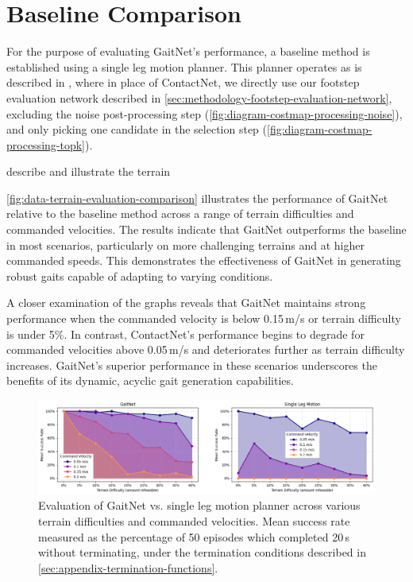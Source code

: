 \section{Baseline Comparison}
\label{sec:results-baseline-comparison}

For the purpose of evaluating GaitNet's performance, a baseline
method is established using a single leg motion planner. This planner
operates as is described in \cite{bratta_contactnet_2024}, where in
place of ContactNet, we directly use our footstep evaluation network
described in \autoref{sec:methodology-footstep-evaluation-network},
excluding the noise post-processing step
(\autoref{fig:diagram-costmap-processing-noise}), and only picking
one candidate in the selection step
(\autoref{fig:diagram-costmap-processing-topk}).

\begin{todo}
  describe and illustrate the terrain
\end{todo}

\autoref{fig:data-terrain-evaluation-comparison} illustrates the
performance of GaitNet relative to the baseline method across a range
of terrain difficulties and commanded velocities. The results
indicate that GaitNet outperforms the baseline in most scenarios,
particularly on more challenging terrains and at higher commanded
speeds. This demonstrates the effectiveness of GaitNet in generating
robust gaits capable of adapting to varying conditions.

A closer examination of the graphs reveals that GaitNet maintains
strong performance when the commanded velocity is below 0.15\,m/s or
terrain difficulty is under 5\%. In contrast, ContactNet's
performance begins to degrade for commanded velocities above
0.05\,m/s and deteriorates further as terrain difficulty increases.
GaitNet's superior performance in these scenarios underscores the
benefits of its dynamic, acyclic gait generation capabilities.

\begin{figure}[H]
  \centering
  \includegraphics[width=\textwidth]{images/data/terrain-evaluation-comparison.png}
  \caption{Evaluation of GaitNet vs. single leg motion planner
    across various terrain difficulties and commanded velocities.
    Mean success rate measured as the percentage of 50 episodes
    which completed 20\,s without terminating, under the termination
  conditions described in \autoref{sec:appendix-termination-functions}.}
  \label{fig:data-terrain-evaluation-comparison}
\end{figure}
